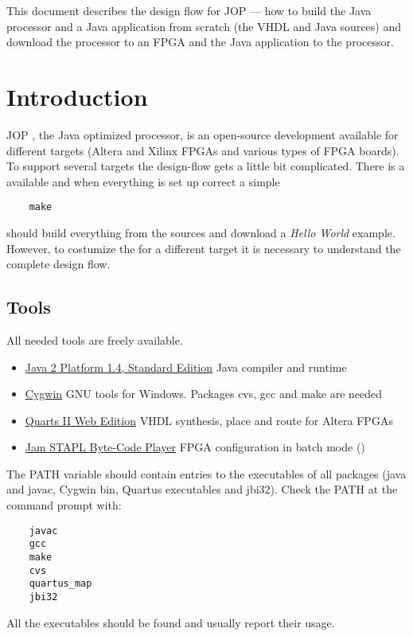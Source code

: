 
This document describes the design flow for JOP --- how to build the
Java processor and a Java application from scratch (the VHDL and
Java sources) and download the processor to an FPGA and the Java
application to the processor.


\section{Introduction}

JOP \cite{jop:thesis}, the Java optimized processor, is an
open-source development available for different targets (Altera and
Xilinx FPGAs and various types of FPGA boards). To support several
targets the design-flow gets a little bit complicated. There is a
 available and when everything is set up correct a
simple
%
\begin{verbatim}
    make
\end{verbatim}
%
should build everything from the sources and download a \emph{Hello
World} example. However, to costumize the  for a
different target it is necessary to understand the complete design
flow.

\subsection{Tools}

All needed tools are freely available.
%
\begin{itemize}
    \item  \href{http://java.sun.com/j2se/1.4.2/download.html}%
{Java 2 Platform 1.4, Standard Edition}  Java compiler and runtime
    \item  \href{http://www.cygwin.com/}%
{Cygwin} GNU tools for Windows. Packages cvs, gcc and make are
needed
    \item  \href{https://www.altera.com/support/software/download/altera_design/quartus_we/dnl-quartus_we.jsp}%
{Quarts II Web Edition} VHDL synthesis, place and route for Altera
FPGAs
    \item  \href{https://www.altera.com/support/software/download/programming/jam/dnl-byte_code_player.jsp}%
{Jam STAPL Byte-Code Player} FPGA configuration in batch mode
()

\end{itemize}
%
The PATH variable should contain entries to the executables of all
packages (java and javac, Cygwin bin, Quartus executables and
jbi32). Check the PATH at the command prompt with:
%
\begin{verbatim}
    javac
    gcc
    make
    cvs
    quartus_map
    jbi32
\end{verbatim}
%
All the executables should be found and usually report their usage.

